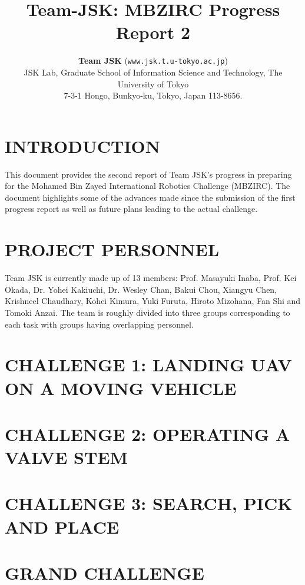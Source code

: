 \documentclass[letterpaper, 10 pt, conference]{ieeeconf}  %
\title{\LARGE \bf
  Team-JSK: MBZIRC Progress Report 2
}
\author{\textbf{Team JSK} ({\texttt{www.jsk.t.u-tokyo.ac.jp}})%
  \\ JSK Lab, Graduate School of Information Science and Technology,
  The University of Tokyo \\
  7-3-1 Hongo, Bunkyo-ku, Tokyo, Japan 113-8656.  \\
}
\begin{document}
\maketitle
\thispagestyle{empty}
\pagestyle{empty}


\section{INTRODUCTION}
This document provides the second report of 
Team JSK's progress in preparing
for the Mohamed Bin Zayed International Robotics Challenge
(MBZIRC). The document highlights some of the advances made since the submission of the first progress report as well as future plans leading to the actual challenge. 


\section{PROJECT PERSONNEL}
Team JSK is currently made up of 13 members: Prof. Masayuki Inaba, Prof. Kei
Okada, Dr. Yohei Kakiuchi, Dr. Wesley Chan, Bakui Chou, Xiangyu Chen,
Krishneel Chaudhary, Kohei Kimura, Yuki Furuta, Hiroto
Mizohana, Fan Shi and Tomoki Anzai. The team is roughly divided into
three groups corresponding to each task with groups having overlapping
personnel.

\section{CHALLENGE 1: LANDING UAV ON A MOVING VEHICLE}




\section{CHALLENGE 2: OPERATING A VALVE STEM}


\section{CHALLENGE 3: SEARCH, PICK AND PLACE}


\section{GRAND CHALLENGE}


\end{document}
